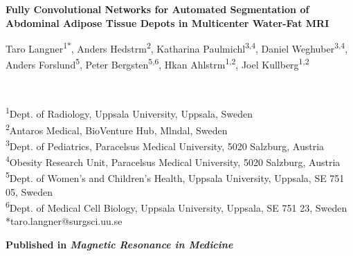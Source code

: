 \documentclass[10pt,letterpaper]{article}
\begin{document}

	\begin{center}
		\textbf{\Large
			Fully Convolutional Networks for Automated Segmentation of Abdominal Adipose Tissue Depots in Multicenter Water-Fat MRI}\\
		\vspace{0.5cm}
		\begin{large}
			Taro Langner\textsuperscript{1*},
			Anders Hedstrm\textsuperscript{2},
			Katharina Paulmichl\textsuperscript{3,4},
			Daniel Weghuber\textsuperscript{3,4},\\
			Anders Forslund\textsuperscript{5},
			Peter Bergsten\textsuperscript{5,6},
			Hkan Ahlstrm\textsuperscript{1,2},
			Joel Kullberg\textsuperscript{1,2}
		\end{large}
		\\
		\bigskip
	\end{center}


	\textsuperscript{1}Dept. of Radiology, Uppsala University, Uppsala, Sweden
	\\
	\textsuperscript{2}Antaros Medical, BioVenture Hub, Mlndal, Sweden
	\\
	\textsuperscript{3}Dept. of Pediatrics, Paracelsus Medical University, 5020 Salzburg, Austria
	\\
	\textsuperscript{4}Obesity Research Unit, Paracelsus Medical University, 5020 Salzburg, Austria
	\\
	\textsuperscript{5}Dept. of Women’s and Children’s Health, Uppsala University, Uppsala, SE 751 05, Sweden
	\\
	\textsuperscript{6}Dept. of Medical Cell Biology, Uppsala University, Uppsala, SE 751 23, Sweden
	\\


	\bigskip
	*taro.langner@surgsci.uu.se


	\bigskip
	\textbf{Published in \textit{Magnetic Resonance in Medicine}}
	\bigskip
\end{document}
